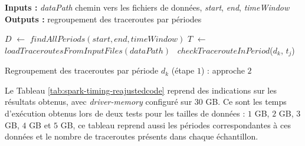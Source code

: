 \begin{algorithm}[H]
	\hspace*{\algorithmicindent} \textbf{Inputs :} \textit{dataPath} chemin vers les fichiers de données, \textit{start}, \textit{end}, \textit{timeWindow}\\
	\hspace*{\algorithmicindent} \textbf{Outputs :} regroupement des traceroutes par périodes
	\begin{algorithmic}[1]
		\State $D$ $\leftarrow$ $ findAllPeriods(start, end, timeWindow) $
		\State $T$ $\leftarrow$ $ loadTraceroutesFromInputFiles( dataPath) $
		 \
		\State $ checkTracerouteInPeriod $($d_k$, $t_{j}$) 
		\EndFor
		\EndFor
	\end{algorithmic}
	\caption{  Regroupement des traceroutes par période $d_k$ (étape $ 1 $) : approche $ 2 $}
	\label{algo:grouper-traceroutes_2}
\end{algorithm}

 Le Tableau 	\ref{tab:spark-timing-reajustedcode} reprend des indications sur les résultats obtenus, avec \textit{driver-memory} configuré sur  $ 30 $ GB.  Ce sont les temps d'exécution obtenus lors de deux tests pour les tailles de données : $1$ GB, $2$ GB, $3$ GB, $4$ GB et $5$ GB, ce tableau reprend aussi les périodes correspondantes à ces données et le nombre de traceroutes présents dans chaque échantillon.

%		

